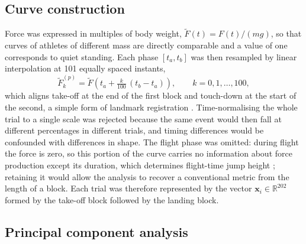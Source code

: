

\subsection{Curve construction}
\label{sec:curves}

Force was expressed in multiples of body weight, $\tilde F(t) = F(t)/(m g)$, so that curves of athletes of different mass are directly comparable and a value of one corresponds to quiet standing. Each phase $[t_a, t_b]$ was then resampled by linear interpolation at 101 equally spaced instants,
\begin{equation}
\tilde F^{(p)}_k = \tilde F\!\left(t_a + \tfrac{k}{100}\,(t_b - t_a)\right), \qquad k = 0, 1, \ldots, 100,
\end{equation}
which aligns take-off at the end of the first block and touch-down at the start of the second, a simple form of landmark registration \citep{ramsay2005,richter2014a,moudy2018}. Time-normalising the whole trial to a single scale was rejected because the same event would then fall at different percentages in different trials, and timing differences would be confounded with differences in shape. The flight phase was omitted: during flight the force is zero, so this portion of the curve carries no information about force production except its duration, which determines flight-time jump height \citep{linthorne2001}; retaining it would allow the analysis to recover a conventional metric from the length of a block. Each trial was therefore represented by the vector $\mathbf{x}_i \in \mathbb{R}^{202}$ formed by the take-off block followed by the landing block.

\subsection{Principal component analysis}

